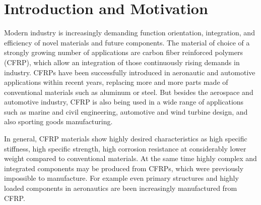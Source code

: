 


\section{Introduction and Motivation}
\label{sec:intro}

Modern industry is increasingly demanding function orientation, integration, and efficiency of novel materials and future components. The material of choice of a strongly growing number of applications are carbon fiber reinforced polymers (CFRP), which allow an integration of those continuously rising demands in industry. CFRPs have been successfully introduced in aeronautic and automotive applications within recent years, replacing more and more parts made of conventional materials such as aluminum or steel. But besides the aerospace and automotive industry, CFRP is also being used in a wide range of applications such as marine and civil engineering, automotive and wind turbine design, and also sporting goods manufacturing. 

In general, CFRP materials show highly desired characteristics as high specific stiffness, high specific strength, high corrosion resistance at considerably lower weight compared to conventional materials. At the same time highly complex and integrated components may be produced from CFRPs, which were previously impossible to manufacture. For example even primary structures and highly loaded components in aeronautics are been increasingly manufactured from CFRP.



